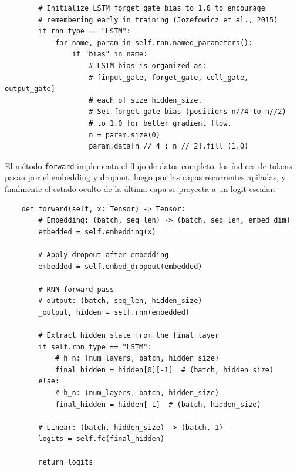 \begin{verbatim}
        # Initialize LSTM forget gate bias to 1.0 to encourage
        # remembering early in training (Jozefowicz et al., 2015)
        if rnn_type == "LSTM":
            for name, param in self.rnn.named_parameters():
                if "bias" in name:
                    # LSTM bias is organized as:
                    # [input_gate, forget_gate, cell_gate, output_gate]
                    # each of size hidden_size.
                    # Set forget gate bias (positions n//4 to n//2)
                    # to 1.0 for better gradient flow.
                    n = param.size(0)
                    param.data[n // 4 : n // 2].fill_(1.0)
\end{verbatim}

El método \texttt{forward} implementa el flujo de datos completo: los índices de
tokens pasan por el embedding y dropout, luego por las capas recurrentes apiladas,
y finalmente el estado oculto de la última capa se proyecta a un logit escalar.

\begin{verbatim}
    def forward(self, x: Tensor) -> Tensor:
        # Embedding: (batch, seq_len) -> (batch, seq_len, embed_dim)
        embedded = self.embedding(x)

        # Apply dropout after embedding
        embedded = self.embed_dropout(embedded)

        # RNN forward pass
        # output: (batch, seq_len, hidden_size)
        _output, hidden = self.rnn(embedded)

        # Extract hidden state from the final layer
        if self.rnn_type == "LSTM":
            # h_n: (num_layers, batch, hidden_size)
            final_hidden = hidden[0][-1]  # (batch, hidden_size)
        else:
            # h_n: (num_layers, batch, hidden_size)
            final_hidden = hidden[-1]  # (batch, hidden_size)

        # Linear: (batch, hidden_size) -> (batch, 1)
        logits = self.fc(final_hidden)

        return logits
\end{verbatim}
